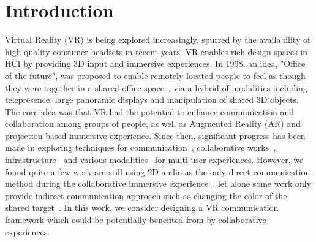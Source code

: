 \documentclass{sigchi}
\begin{document}
\section{Introduction}
Virtual Reality (VR) is being explored increasingly, spurred by the availability of high quality consumer headsets in recent years. VR enables rich design spaces in HCI by providing 3D input and immersive experiences. In 1998, an idea, "Office of the future", was proposed to enable remotely located people to feel as though they were together in a shared office space~\cite{raskar1998office}, via a hybrid of modalities including telepresence, large panoramic displays and manipulation of shared 3D objects. The core idea was that VR had the potential to enhance communication and collaboration among groups of people, as well as Augmented Reality (AR) and projection-based immersive experience. Since then, significant progress has been made in exploring techniques for communication~\cite{ishii1993integration, otsuka2016mmspace}, collaborative works~\cite{kunert2014photoportals,tang2010three}, infrastructure~\cite{maimone2013general, o2011blended, thomas2014muvr} and various modalities~\cite{follmer2013inform, leithinger2014physical, leithinger2015shape, nakagaki2019inforce} for multi-user experiences. However, we found quite a few work are still using 2D audio as the only direct communication method during the collaborative immersive experience~\cite{xia2018spacetime}, let alone some work only provide indirect communication approach such as changing the color of the shared target~\cite{huo2018synchronizar}. In this work, we consider designing a VR communication framework which could be potentially benefited from by collaborative experiences.
\end{document}
